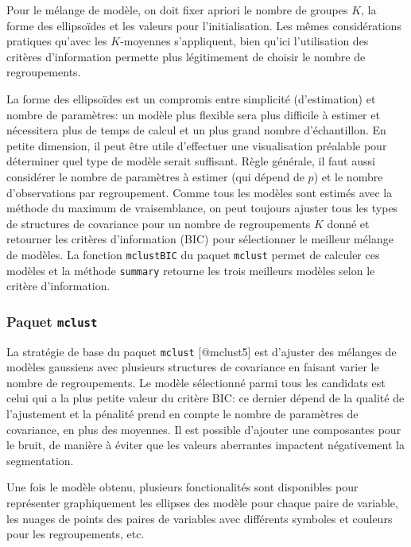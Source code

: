 \documentclass[
  11pt,
  letterpaper,
]{scrbook}
\theoremstyle{definition}
\theoremstyle{remark}
\begin{document}
Pour le mélange de modèle, on doit fixer apriori le nombre de groupes
\(K\), la forme des ellipsoïdes et les valeurs pour l'initialisation.
Les mêmes considérations pratiques qu'avec les \(K\)-moyennes
s'appliquent, bien qu'ici l'utilisation des critères d'information
permette plus légitimement de choisir le nombre de regroupements.

La forme des ellipsoïdes est un compromis entre simplicité
(d'estimation) et nombre de paramètres: un modèle plus flexible sera
plus difficile à estimer et nécessitera plus de temps de calcul et un
plus grand nombre d'échantillon. En petite dimension, il peut être utile
d'effectuer une visualisation préalable pour déterminer quel type de
modèle serait suffisant. Règle générale, il faut aussi considérer le
nombre de paramètres à estimer (qui dépend de \(p\)) et le nombre
d'observations par regroupement. Comme tous les modèles sont estimés
avec la méthode du maximum de vraisemblance, on peut toujours ajuster
tous les types de structures de covariance pour un nombre de
regroupements \(K\) donné et retourner les critères d'information (BIC)
pour sélectionner le meilleur mélange de modèles. La fonction
\texttt{mclustBIC} du paquet \texttt{mclust} permet de calculer ces
modèles et la méthode \texttt{summary} retourne les trois meilleurs
modèles selon le critère d'information.

\hypertarget{paquet-mclust}{%
\subsubsection{\texorpdfstring{Paquet
\texttt{mclust}}{Paquet mclust}}\label{paquet-mclust}}

La stratégie de base du paquet \texttt{mclust} {[}@mclust5{]} est
d'ajuster des mélanges de modèles gaussiens avec plusieurs structures de
covariance en faisant varier le nombre de regroupements. Le modèle
sélectionné parmi tous les candidats est celui qui a la plus petite
valeur du critère BIC: ce dernier dépend de la qualité de l'ajustement
et la pénalité prend en compte le nombre de paramètres de covariance, en
plus des moyennes. Il est possible d'ajouter une composantes pour le
bruit, de manière à éviter que les valeurs aberrantes impactent
négativement la segmentation.

Une fois le modèle obtenu, plusieurs fonctionalités sont disponibles
pour représenter graphiquement les ellipses des modèle pour chaque paire
de variable, les nuages de points des paires de variables avec
différents symboles et couleurs pour les regroupements, etc.
\end{document}
